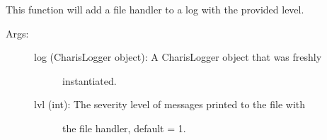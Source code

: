 \documentclass[letterpaper,10pt,english]{sphinxmanual}
\begin{document}
\begin{fulllineitems}

\begin{fulllineitems}
\label{tools:tools.initLogger.CharisLogger.tooldebug}
\end{fulllineitems}


\begin{fulllineitems}
\label{tools:tools.initLogger.CharisLogger.toolerror}
\end{fulllineitems}


\begin{fulllineitems}
\label{tools:tools.initLogger.CharisLogger.toolinfo}
\end{fulllineitems}


\begin{fulllineitems}
\label{tools:tools.initLogger.CharisLogger.toolwarning}
\end{fulllineitems}


\end{fulllineitems}


\begin{fulllineitems}
\label{tools:tools.initLogger.addFileHandler}
This function will add a file handler to a log with the provided level.
\begin{description}
\item[{Args:}] \leavevmode\begin{description}
\item[{log (CharisLogger object): A CharisLogger object that was freshly }] \leavevmode
instantiated.

\item[{lvl (int): The severity level of messages printed to the file with }] \leavevmode
the file handler, default = 1.

\end{description}

\end{description}

\end{fulllineitems}
\end{document}
